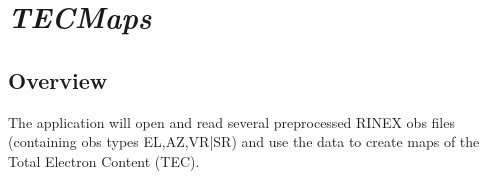 %
%


\section{\emph{TECMaps}}
\subsection{Overview}
 The application will open and read several preprocessed RINEX obs files
 (containing obs types EL,AZ,VR|SR) and use the data to create maps of
 the Total Electron Content (TEC).

